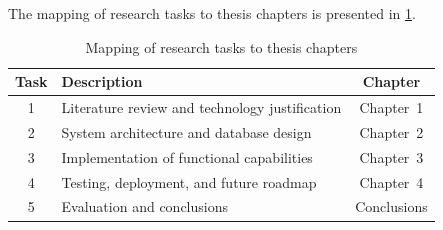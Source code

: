 The mapping of research tasks to thesis chapters is presented in \cref{tab:task-chapter}.

\begin{table}[htbp]
\caption{Mapping of research tasks to thesis chapters}
\label{tab:task-chapter}
\centering
\begin{tabular}{clc}
\toprule
\textbf{Task} & \textbf{Description} & \textbf{Chapter} \\
\midrule
1 & Literature review and technology justification & Chapter~1 \\
2 & System architecture and database design & Chapter~2 \\
3 & Implementation of functional capabilities & Chapter~3 \\
4 & Testing, deployment, and future roadmap & Chapter~4 \\
5 & Evaluation and conclusions & Conclusions \\
\bottomrule
\end{tabular}
\end{table}

